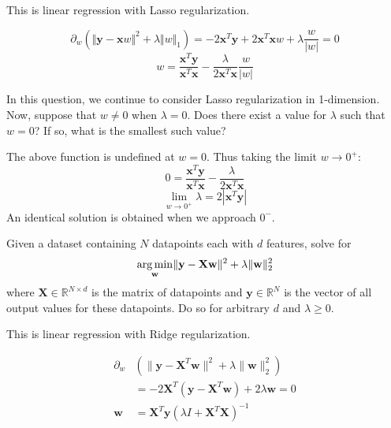 This is linear regression with Lasso regularization.

\begin{subsolution}
 \begin{equation}
   \partial_w(\Vert\mathbf{y} - \mathbf{x}w\Vert^2 + \lambda\Vert w\Vert_1) = -2\mathbf{x}^T\mathbf{y}+2\mathbf{x}^T\mathbf{x}w+\lambda \frac{w}{|w|}= 0
 \end{equation}
 \begin{equation}
  w = \frac{\mathbf{x}^T\mathbf{y}}{\mathbf{x}^T\mathbf{x}}-\frac{\lambda}{2\mathbf{x}^T\mathbf{x}}\frac{w}{|w|}
\end{equation}
\end{subsolution}

\subproblem
In this question, we continue to consider Lasso regularization in 1-dimension. Now, suppose that $w \neq 0$ when $\lambda = 0$. Does there exist a value for $\lambda$ such that $w = 0$? If so, what is the smallest such value?

\begin{subsolution}
  The above function is undefined at $w=0$. Thus taking the limit $w\rightarrow 0^+$:
  \begin{equation}
    0 = \frac{\mathbf{x}^T\mathbf{y}}{\mathbf{x}^T\mathbf{x}}-\frac{\lambda}{2\mathbf{x}^T\mathbf{x}}
  \end{equation}
  \begin{equation}
    \lim_{w\rightarrow 0^+}\lambda = 2|\mathbf{x}^T\mathbf{y}|
  \end{equation}
  An identical solution is obtained when we approach $0^-$.
\end{subsolution}

\problem[9]
\subproblem
Given a dataset containing $N$ datapoints each with $d$ features, solve for
\[\underset{\mathbf{w}}{\operatorname{arg\,min}} \Vert\mathbf{y} - \mathbf{X}\mathbf{w}\Vert^2 + \lambda\Vert\mathbf{w}\Vert_2^2
\]
where $\mathbf{X} \in \mathbb{R}^{N \times d}$ is the matrix of datapoints and $\mathbf{y} \in \mathbb{R}^N$ is the  vector of all output values for these datapoints. Do so for arbitrary $d$ and $\lambda \geq 0$.

This is linear regression with Ridge regularization.

\begin{subsolution}
  \begin{align}
    \partial_w &\left( \|\textbf{y} - \textbf{X}^{T}\textbf{w}\|^2 + \lambda\|\textbf{w}\|_2^2\right) \\
    &= -2\textbf{X}^T (\textbf{y} - \textbf{X}^{T}\textbf{w}) + 2\lambda\textbf{w} = 0 \\
  \textbf{w} &= \textbf{X}^T\textbf{y}(\lambda I + \textbf{X}^T\textbf{X})^{-1}
    \end{align} 
\end{subsolution}

